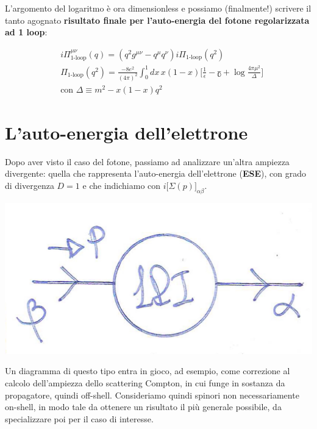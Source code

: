 \documentclass[../main.tex]{subfiles}
\begin{document}
L'argomento del logaritmo è ora dimensionless e possiamo (finalmente!) scrivere il tanto agognato \textbf{risultato finale per l'auto-energia del fotone regolarizzata ad 1 loop}:

\begin{equation}
    \boxed{
    \begin{aligned}
        &i\Pi^{\mu\nu}_{\text{1-loop}}(q) = (q^2g^{\mu\nu}-q^\mu q^\nu) i \Pi_{\text{1-loop}}(q^2) \\
        & \Pi_{\text{1-loop}}(q^2) = \frac{-8e^2}{ (4\pi)^2 } \int_0^1 dx\,x(1-x)\bigg[\frac{1}{\epsilon} - \mathbb{\gamma} + \log{\frac{4\pi\mu^2}{\Delta}}\bigg] \\
        &\text{con } \Delta \equiv m^2 - x(1-x)q^2
    \end{aligned}
    }
    \label{eq:Pi_munu_summary_final}
\end{equation}

\section{L'auto-energia dell'elettrone}
Dopo aver visto il caso del fotone, passiamo ad analizzare un'altra ampiezza divergente: quella che rappresenta l'auto-energia dell'elettrone (\textbf{ESE}), con grado di divergenza $D=1$ e che indichiamo con $\boxed{i\bigl[\Sigma(p)\bigr]_{\alpha\beta}}$.

\includegraphics[]{images_ch2/electron_self_energy.JPG}

Un diagramma di questo tipo entra in gioco, ad esempio, come correzione al calcolo dell'ampiezza dello scattering Compton, in cui funge in sostanza da propagatore, quindi off-shell.
Consideriamo quindi spinori non necessariamente on-shell, in modo tale da ottenere un risultato il più generale possibile, da specializzare poi per il caso di interesse.
\end{document}
